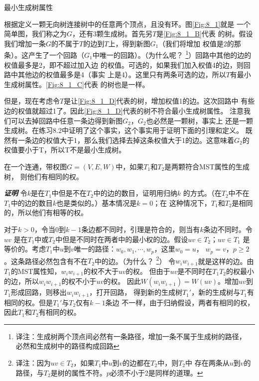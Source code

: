 \begin{example}
最小生成树属性

根据定义一颗无向树连接树中的任意两个顶点，且没有环。图\ref{Fig:8_1}就是
一个简单图，我们称之为$G$，还有3颗生成树。首先另$T$是\ref{Fig:8_1_B}代表
的树。假设我们增加一条$G$的不属于$T$的边到$T$上，得到新图$G_1$（我们将增加
权值是2的那条）。这产生了一个回路（$G_1$中唯一的回路）。（为什么呢？
\footnote{译注：生成树两个顶点间必然有一条路径，增加一条不属于生成树的路径，
必然和生成树中的路径构成回路}）回路中其他的边的权值最多是2，即不超过加入边
的权值。可选的，如果我们加入权值4的边，则回路中其他边的权值最多是4（事实
上是4）。这里只有两条可选的边，所以$T$有最小生成树属性。\ref{Fig:8_1_C}代表
的树也是一样。

但是，现在考虑令$T$是让\ref{Fig:8_1_D}代表的树，增加权值1的边。这次回路中
有些边的权值就超过1了。因此\ref{Fig:8_1_D}代表的树不符合最小生成树属性。
注意我们可以去掉回路中任意一条边得到新图$G_2$，$G_2$也必然是一颗树，事实上
还是一颗生成树。在练习8.2中证明了这个事实，这个事实用于证明下面的引理和定义。
既然有一条边的权值大于1，那么我们选择去掉这条权值大于1的边。这意味着$G_2$的
权值要小于T，所以T不是最小生成树。
\end{example}

\begin{lemma}\label{Lemma:8_1}
在一个连通，带权图$G=(V, E, W)$中，如果$T_1$和$T_2$是两颗符合MST属性的生成树，
则他们有相同的权。

{\textbf{\emph{证明}}} 令$k$是在$T_1$中但是不在$T_2$中的边的数目，证明用归纳$k$
的方式。（在$T_2$中不在$T_1$中的边的数目$k$也是类似的。）基本情况是$k=0$；在
这种情况下，$T_1$和$T_2$是相同的，所以他们有相等的权。

对于$k>0$，令当0到$k-1$条边都不同时，引理是符合的，则当有$k$条边不同时。令$uv$
是在$T_1$中或$T_2$中但是不同时在两者中的最小权的边。假设$uv\in T_2$；$uv\in T_1$
是等价的。考虑$T_1$中$u$到$v$唯一的路径：$w_0, w_1, \cdots, w_p$，这里$w_0=u$，
$w_p=v$，$p\geq 2$。这条路径必然包含有不在$T_2$中的边。（为什么？
\footnote{译注：因为$uv\in T_2$，如果$T_1$中$u$到$v$的边都在$T_2$中，则$T_2$中
存在两条从$u$到$v$的路径，与$T_2$是树的属性不符。$p$必须不小于2是同样的道理。}）
令$w_iw_{i+1}$就是这样的边。由$T_1$的MST属性知，$w_iw_{i+1}$的权不大于$uv$的权。
但由于$uv$是不同时在$T_1T_2$的权最小的边，所以$w_iw_{i+1}$的权不小于$uv$的权。
因此$W(w_iw_{i+1})=W(uv)$。增加$uv$到$T_1$形成回路，则移出$w_iw_{i+1}$，打开回路，
得到新的生成树$T_1'$，新的生成树与$T_1$有相同的权。但是$T_1'$与$T_2$仅有$k-1$条边
不一样，由于归纳假设，两者有相同的权，因此$T_1$和$T_2$有相同的权。
\end{lemma}

